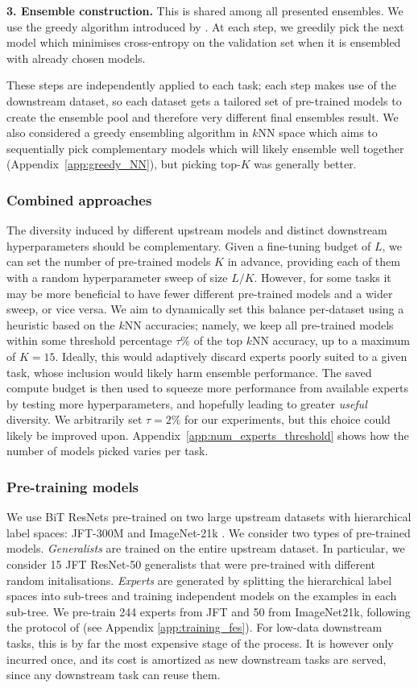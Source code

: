 \documentclass{article} \usepackage{iclr2021_conference,times}
\begin{document}
\textbf{3. Ensemble construction.}
This is shared among all presented ensembles. We use the greedy algorithm introduced by \cite{caruana2004ensembleselection}. At each step, we greedily pick the next model which minimises cross-entropy on the validation set when it is ensembled with already chosen models.

These steps are independently applied to each task; each step makes use of the downstream dataset, so each dataset gets a tailored set of pre-trained models to create the ensemble pool and therefore very different final ensembles result.
We also considered a greedy ensembling algorithm in $k$NN space which aims to sequentially pick complementary models which will likely ensemble well together (Appendix~\ref{app:greedy_NN}), but picking top-$K$ was generally better.

\subsubsection{Combined approaches}
\label{sec:combine}
The diversity induced by different upstream models and distinct downstream hyperparameters should be complementary. Given a fine-tuning budget of $L$, we can set the number of pre-trained models $K$ in advance, providing each of them with a random hyperparameter sweep of size ${L}/{K}$.
However, for some tasks it may be more beneficial to have fewer different pre-trained models and a wider sweep, or vice versa. We aim to dynamically set this balance per-dataset using a heuristic based on the $k$NN accuracies; namely, we keep all pre-trained models within some threshold percentage $\tau$\% of the top $k$NN accuracy, up to a maximum of $K = 15$. Ideally, this would adaptively discard experts poorly suited to a given task, whose inclusion would likely harm ensemble performance. The saved compute budget is then used to squeeze more performance from available experts by testing more hyperparameters, and hopefully leading to greater \emph{useful} diversity.
We arbitrarily set $\tau = 2\%$  for our experiments, but this choice could likely be improved upon. Appendix~\ref{app:num_experts_threshold} shows how the number of models picked varies per task.


\subsubsection{Pre-training models}
We use BiT ResNets pre-trained on two large upstream datasets with hierarchical label spaces: JFT-300M \citep{jft300m} and ImageNet-21k \citep{deng2009imagenet}.
We consider two types of pre-trained models.
\emph{Generalists} are trained on the entire upstream dataset. In particular, we consider 15 JFT ResNet-50 generalists that were pre-trained with different random initalisations.
\emph{Experts} are generated by splitting the hierarchical label spaces into sub-trees and training independent models on the examples in each sub-tree. We pre-train 244 experts from JFT and 50 from ImageNet21k, following the protocol of \citep{puigcerver2020experts} (see Appendix \ref{app:training_fes}).
For low-data downstream tasks, this is by far the most expensive stage of the process. It is however only incurred once, and its cost is amortized as new downstream tasks are served, since any downstream task can reuse them.
%
\end{document}
